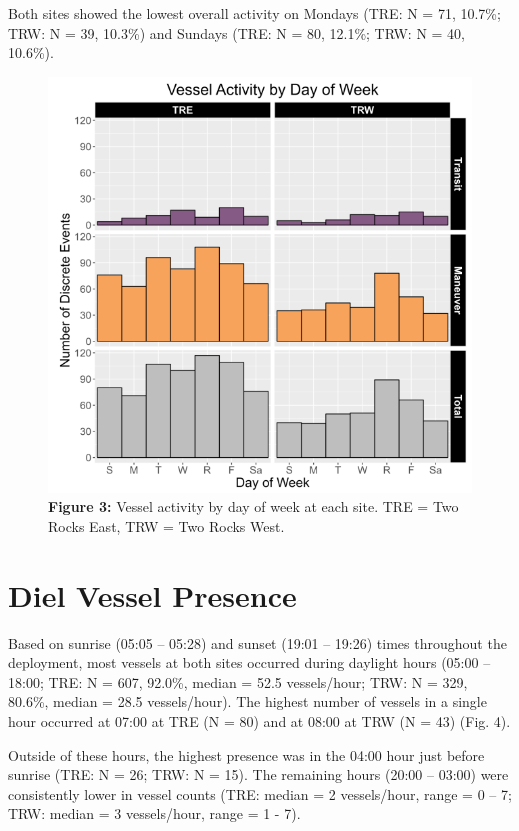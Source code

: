 \documentclass[
  letterpaper,
  oneside,
  open=any]{scrbook}
\begin{document}
Both sites showed the lowest overall activity on Mondays (TRE: N = 71,
10.7\%; TRW: N = 39, 10.3\%) and Sundays (TRE: N = 80, 12.1\%; TRW: N =
40, 10.6\%).

\begin{figure}[H]

{\centering \includegraphics{images/Figure.3.PNG}

}

\caption{\textbf{Figure 3:} Vessel activity by day of week at each site.
TRE = Two Rocks East, TRW = Two Rocks West.}

\end{figure}%

\section{Diel Vessel Presence}\label{diel-vessel-presence}

Based on sunrise (05:05 -- 05:28) and sunset (19:01 -- 19:26) times
throughout the deployment, most vessels at both sites occurred during
daylight hours (05:00 -- 18:00; TRE: N = 607, 92.0\%, median = 52.5
vessels/hour; TRW: N = 329, 80.6\%, median = 28.5 vessels/hour). The
highest number of vessels in a single hour occurred at 07:00 at TRE (N =
80) and at 08:00 at TRW (N = 43) (Fig. 4).

Outside of these hours, the highest presence was in the 04:00 hour just
before sunrise (TRE: N = 26; TRW: N = 15). The remaining hours (20:00 --
03:00) were consistently lower in vessel counts (TRE: median = 2
vessels/hour, range = 0 -- 7; TRW: median = 3 vessels/hour, range = 1 -
7).
\end{document}
